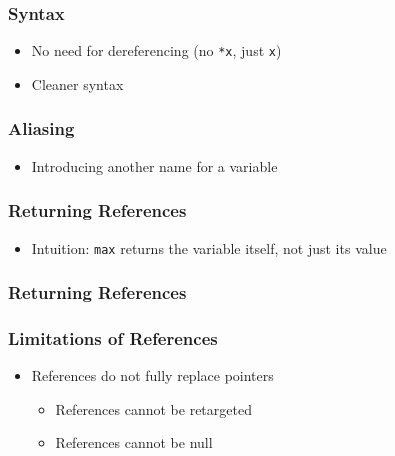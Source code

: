\begin{frame}
  \frametitle{Syntax}
  \begin{itemize}
    \item No need for dereferencing (no \texttt{*x}, just \texttt{x})
    \item Cleaner syntax
  \end{itemize}
\end{frame}

\begin{frame}
  \frametitle{Aliasing}
  \begin{itemize}
    \item Introducing another name for a variable
  \end{itemize}
  \vskip5mm
  \begin{overprint}

  \end{overprint}
\end{frame}

\begin{frame}
  \frametitle{Returning References}
  \begin{itemize}
    \item Intuition: \texttt{max} returns the variable itself, not just its value
  \end{itemize}
\end{frame}

\begin{frame}
  \frametitle{Returning References}
\end{frame}

\begin{frame}
  \frametitle{Limitations of References}
  \begin{itemize}
    \item References do not fully replace pointers
          \begin{itemize}
            \item References cannot be retargeted
            \item References cannot be null
          \end{itemize}
  \end{itemize}
  \vskip4mm
\end{frame}

